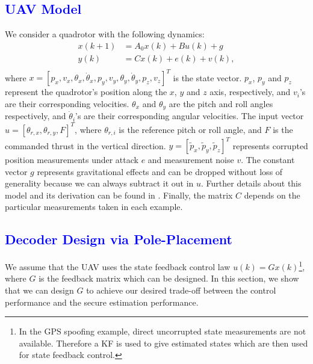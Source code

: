 \documentclass[12pt, conference, a4paper, twoside]{IEEEconf_mod}
\begin{document}
\subsection{\textcolor{blue}{UAV Model}}
We consider a quadrotor with the following dynamics:
\begin{equation}
\begin{aligned}
x(k+1) &= A_0 x(k) + B u(k)  + g\\
y(k) &= C x(k) + e(k) + v(k), \\
\end{aligned}
\end{equation}
\noindent 
where $x = [p_x, v_x, \theta_x, \dot \theta_x, p_y, v_y, \theta_y, \dot\theta_y, p_z, v_z]^T$ is the state vector. $p_x$, $p_y$ and $p_z$ represent the quadrotor's position along the $x$, $y$ and $z$ axis, respectively, and $v_i$'s are their corresponding velocities. $\theta_x$ and $\theta_y$ are the pitch and roll angles respectively, and $\dot \theta_i$'s are their corresponding angular velocities. %
The input vector $u = [\theta_{r,x}, \theta_{r,y}, F]^T$, where $\theta_{r,i}$ is the reference pitch or roll angle, and $F$ is the commanded thrust in the vertical direction. $y = [\tilde{p}_x, \tilde{p}_y, \tilde{p}_z]^T$ %
represents corrupted position measurements under attack $e$ and measurement noise $v$.
The constant vector $g$ represents gravitational effects and can be dropped without loss of generality because we can always subtract it out in $u$. 
Further details about this model and its derivation can be found in \cite{Bouffard}. Finally, the matrix $C$ depends on the particular measurements taken in each example.




\subsection{\textcolor{blue}{Decoder Design via Pole-Placement}}

We assume that the UAV uses the state feedback control law $u(k) = G x(k)$\footnote{In the GPS spoofing example, direct uncorrupted state measurements are not available. Therefore a KF is used to give estimated states which are then used for state feedback control.}, where $G$ is the feedback matrix which can be designed. In this section, we show that we can design $G$ to achieve our desired trade-off between the control performance and the secure estimation performance. 
\end{document}
